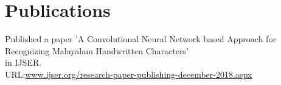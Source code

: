 \documentclass[11pt]{hieudo-build}
\begin{document}
\begin{minipage}[t]{0.65\textwidth}
\section{Publications}
Published a paper 'A Convolutional Neural Network based Approach for Recognizing Malayalam Handwritten Characters'\\ in IJSER.\\
URL:\href {  https://www.ijser.org/onlineResearchPaperViewer.aspx?A-Convolutional-Neural-Network-based-Approach-for-Recognizing-Malayalam-Handwritten-Characters.pdf}{www.ijser.org/research-paper-publishing-december-2018.aspx}




%
%



\sectionsep


\end{minipage}
\end{document}

